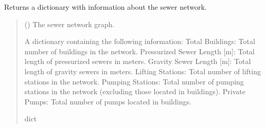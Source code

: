 \documentclass[letterpaper,10pt,english]{sphinxmanual}
\begin{document}
\begin{fulllineitems}
\label{\detokenize{pysewer:pysewer.helper.get_sewer_info}}
\pysigstartsignatures
{}
\pysigstopsignatures
\sphinxAtStartPar
Returns a dictionary with information about the sewer network.
\begin{quote}\begin{description}
\sphinxAtStartPar
{} () \textendash{} The sewer network graph.

\sphinxAtStartPar
A dictionary containing the following information:
\sphinxhyphen{} Total Buildings: Total number of buildings in the network.
\sphinxhyphen{} Pressurized Sewer Length {[}m{]}: Total length of pressurized sewers in meters.
\sphinxhyphen{} Gravity Sewer Length {[}m{]}: Total length of gravity sewers in meters.
\sphinxhyphen{} Lifting Stations: Total number of lifting stations in the network.
\sphinxhyphen{} Pumping Stations: Total number of pumping stations in the network (excluding those located in buildings).
\sphinxhyphen{} Private Pumps: Total number of pumps located in buildings.

\sphinxAtStartPar
dict

\end{description}\end{quote}

\end{fulllineitems}

\end{document}
